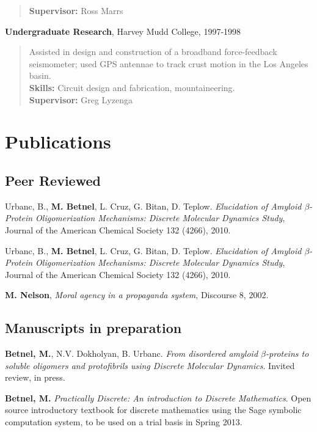 \documentclass[letterpaper]{article}
\renewenvironment{itemize}{
  \begin{list}{}{
    \setlength{\leftmargin}{1em}
  }
}{
  \end{list}
}
\begin{document}
\begin{itemize}
\begin{quote}
	\textbf{Supervisor:} Ross Marrs
\end{quote}
	\item \textbf{Undergraduate Research}, Harvey Mudd College, 1997-1998
\vspace{-0.5em}
\begin{quote}
	Assisted in design and construction of a broadband force-feedback seismometer; used GPS antennae to track crust motion in the Los Angeles basin.\\
	\textbf{Skills:} Circuit design and fabrication, mountaineering. \\
	\textbf{Supervisor:} Greg Lyzenga
\end{quote}
\end{itemize}


\section*{Publications}
\subsection*{Peer Reviewed}
\begin{itemize}
	\item Urbanc, B., \textbf{M. Betnel}, L. Cruz, G. Bitan, D. Teplow.  
\emph{Elucidation of Amyloid $\beta$-Protein Oligomerization Mechanisms: Discrete Molecular Dynamics Study}, Journal of the American Chemical Society  132 (4266), 2010.     
	\item Urbanc, B., \textbf{M. Betnel}, L. Cruz, G. Bitan, D. Teplow.  
\emph{Elucidation of Amyloid $\beta$-Protein Oligomerization Mechanisms: Discrete Molecular Dynamics Study}, Journal of the American Chemical Society  132 (4266), 2010.     
	\item \textbf{M. Nelson}, \emph{Moral agency in a propaganda system}, Discourse 8, 2002.
\end{itemize}

\subsection*{Manuscripts in preparation}
\begin{itemize}
	\item \textbf{Betnel, M.}, N.V. Dokholyan, B. Urbanc.  
	\emph{From disordered amyloid $\beta$-proteins to soluble oligomers and 
	protofibrils using Discrete Molecular Dynamics}.  
	Invited review, in press.  

	\item \textbf{Betnel, M.}
	\emph{Practically Discrete: An introduction to Discrete Mathematics}.
	Open source introductory textbook for discrete mathematics using the Sage symbolic computation system, to be used on a trial basis in Spring 2013.
\end{itemize}
\end{document}
